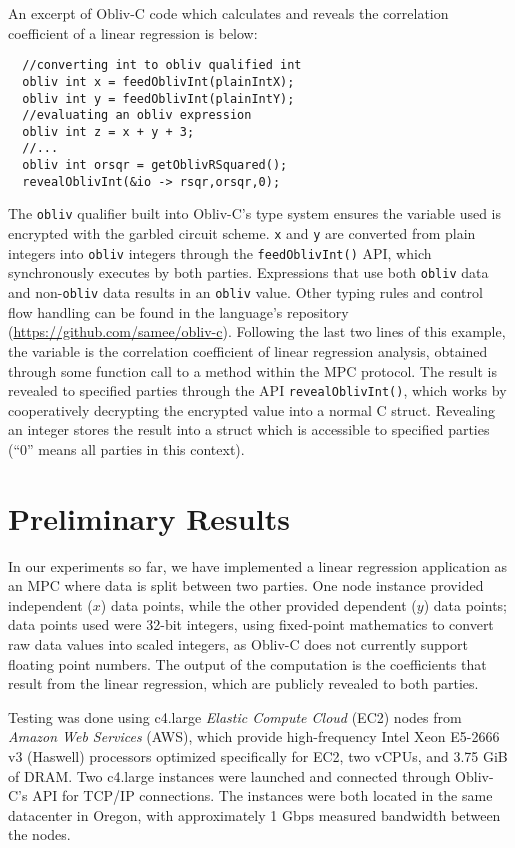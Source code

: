 \documentclass[conference]{IEEEtran}
\begin{document}
An excerpt of Obliv-C code which calculates and reveals the correlation
coefficient of a linear regression is below:
\begin{verbatim}
  //converting int to obliv qualified int
  obliv int x = feedOblivInt(plainIntX);
  obliv int y = feedOblivInt(plainIntY);
  //evaluating an obliv expression
  obliv int z = x + y + 3;
  //...
  obliv int orsqr = getOblivRSquared();
  revealOblivInt(&io -> rsqr,orsqr,0);
\end{verbatim}
\noindent
The {\tt obliv} qualifier built into Obliv-C’s type system ensures
the variable used is encrypted with the garbled circuit 
scheme\cite{cryptoeprint:2015:1153}. {\tt x} and {\tt y} are converted 
from plain integers into {\tt obliv}
integers through the {\tt feedOblivInt()} API, which synchronously executes 
by both parties. Expressions that use both {\tt obliv} data and 
non-{\tt obliv} data results in an {\tt obliv} value.
Other typing rules and control flow handling can be found in
the language’s repository (\url{https://github.com/samee/obliv-c}).
Following the last two lines of this example, the variable is the
correlation coefficient of linear regression analysis, obtained through
some function call to a method within the MPC protocol. The result is
revealed to specified parties through the API {\tt revealOblivInt()},
which works by cooperatively decrypting the encrypted value into a
normal C struct.  Revealing an integer stores the result into a struct
which is accessible to specified parties (``0'' means all parties in this
context).

\section{Preliminary Results}

In our experiments so far, we have implemented a linear regression
application as an MPC where data is split between two parties.  One node
instance provided independent ($x$) data points, while the other
provided dependent ($y$) data points; data points used were 32-bit
integers, using fixed-point mathematics to convert raw data values into
scaled integers, as Obliv-C does not currently support floating point
numbers.  The output of the computation is the coefficients that result
from the linear regression, which are publicly revealed to both parties.

Testing was done using c4.large \emph{Elastic Compute Cloud} (EC2) nodes
from \emph{Amazon Web Services} (AWS)\cite{aws:ec2}, which provide
high-frequency Intel Xeon E5-2666 v3 (Haswell) processors optimized
specifically for EC2, two vCPUs, and 3.75 GiB of DRAM.  Two c4.large
instances were launched and connected through Obliv-C's API for TCP/IP
connections. The instances were both located in the same datacenter in
Oregon, with approximately 1 Gbps measured bandwidth between the
nodes. 
\end{document}
